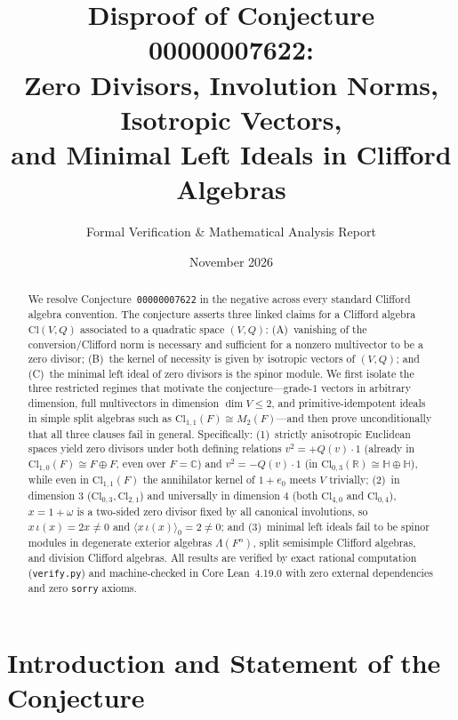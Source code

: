 \documentclass[11pt]{article}
\title{\textbf{Disproof of Conjecture 00000007622:\\
Zero Divisors, Involution Norms, Isotropic Vectors,\\
and Minimal Left Ideals in Clifford Algebras}}
\author{Formal Verification \& Mathematical Analysis Report}
\date{November 2026}
\theoremstyle{definition}
\newcommand{\Cl}{\mathrm{Cl}}
\begin{document}
\maketitle

\begin{abstract}
We resolve Conjecture~\texttt{00000007622} in the negative across every standard
Clifford algebra convention. The conjecture asserts three linked claims for a
Clifford algebra $\Cl(V, Q)$ associated to a quadratic space $(V, Q)$:
(A)~vanishing of the conversion/Clifford norm is necessary and sufficient for a
nonzero multivector to be a zero divisor; (B)~the kernel of necessity is given by
isotropic vectors of $(V, Q)$; and (C)~the minimal left ideal of zero divisors is
the spinor module. We first isolate the three restricted regimes that motivate the
conjecture---grade-$1$ vectors in arbitrary dimension, full multivectors in
dimension $\dim V \le 2$, and primitive-idempotent ideals in simple split algebras
such as $\Cl_{1,1}(F) \cong M_2(F)$---and then prove unconditionally that all three
clauses fail in general. Specifically: (1)~strictly anisotropic Euclidean spaces
yield zero divisors under both defining relations $v^2 = +Q(v)\cdot 1$ (already in
$\Cl_{1,0}(F) \cong F \oplus F$, even over $F = \mathbb{C}$) and $v^2 = -Q(v)\cdot 1$
(in $\Cl_{0,3}(\mathbb{R}) \cong \mathbb{H} \oplus \mathbb{H}$), while even in
$\Cl_{1,1}(F)$ the annihilator kernel of $1 + e_0$ meets $V$ trivially;
(2)~in dimension $3$ ($\Cl_{0,3}, \Cl_{2,1}$) and universally in dimension $4$
(both $\Cl_{4,0}$ and $\Cl_{0,4}$), $x = 1 + \omega$ is a two-sided zero divisor
fixed by all canonical involutions, so $x\,\iota(x) = 2x \neq 0$ and
$\langle x\,\iota(x)\rangle_0 = 2 \neq 0$; and (3)~minimal left ideals fail to be
spinor modules in degenerate exterior algebras $\Lambda(F^n)$, split semisimple
Clifford algebras, and division Clifford algebras. All results are verified by
exact rational computation (\texttt{verify.py}) and machine-checked in Core
Lean~4.19.0 with zero external dependencies and zero \texttt{sorry} axioms.
\end{abstract}

\section{Introduction and Statement of the Conjecture}
\end{document}
